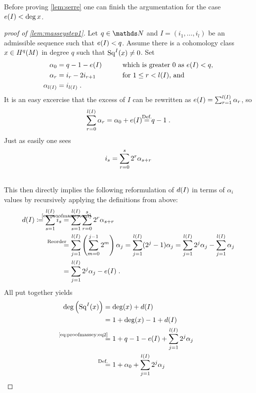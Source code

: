 Before proving \autoref{lem:serre} one can finish the argumentation for
the case $e(I)<\deg x$.
\begin{proof}[proof of \autoref{lem:masseystep1}]
  Let $q\in\Nat$ and $I=(i_1,\dotsc,i_l)$ be an admissible sequence such that
  $e(I)<q$.
  Assume there is a cohomology class $x\in H^q(M)$ in degree $q$ such
  that $\mathrm{Sq}^{I}(x)\neq0$.
  Set
  \begin{alignat*}{4}
    \alpha_0 &= q-1-e(I) &\qquad&\text{which is greater 0 as $e(I)<q$,} \\
    \alpha_r &= i_{r}-2i_{r+1} &&\text{for $1\leq r< l(I)$, and} \\ 
    \alpha_{l(I)} &= i_{l(I)}
    \;.
  \end{alignat*}
  It is an easy excercise that the excess of $I$ can be rewritten as
  $e(I)=\sum_{r=1}^{l(I)}\alpha_r$, so
  \begin{gather}\label{eq:alpha0}
    \sum_{r=0}^{\l(I)}\alpha_r = \alpha_0 + \e(I) \cequalsby{Def.} q-1
    \;.
  \end{gather}
  Just as easily one sees
  \begin{align}\label{eq:proofmassey:eq1}
    i_s
    &= \sum_{r=0}^{s}2^r\alpha_{s+r}\\\notag
  \end{align}
  This then directly implies the following reformulation of $d(I)$ in
  terms of $\alpha_i$ values
  by recursively applying the definitions from above:
  \begin{align}\notag
    \d(I) \coloneqq \sum_{s=1}^{\l(I)}i_s 
    &\cequalsby{\eqref{eq:proofmassey:eq1}}
      \sum_{s=1}^{\l(I)}\sum_{r=0}^{s}2^r\alpha_{s+r}\\\notag
    &\equalsby{Reorder} \sum_{j=1}^{\l(I)}
      \left(\sum_{m=0}^{j-1}2^m\right)\alpha_j
      = \sum_{j=1}^{\l(I)}(2^j-1)\alpha_j 
      = \sum_{j=1}^{\l(I)}2^j\alpha_j
      - \sum_{j=1}^{\l(I)}\alpha_j\\
    \label{eq:proofmassey:eq2}
    &= \sum_{j=1}^{\l(I)}2^j\alpha_j
      - \e(I)
      \;.
  \end{align}
  All put together yields
  \begin{align*}
    \deg\left(\Sq I(x)\right)
    &= \deg(x) + \d(I)\\
    &= 1 + \deg(x) -1 +\d(I) \\
    &\equalsby{\eqref{eq:proofmassey:eq2}}
      1 + q - 1 - \e(I) + \sum_{j=1}^{\l(I)}2^j\alpha_j \\
    &\equalsby{Def.}
      1 + \alpha_0 + \sum_{j=1}^{\l(I)}2^j\alpha_j \\

\end{align*}
\end{proof}
